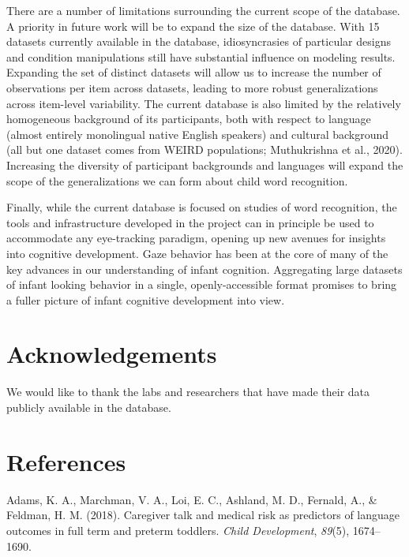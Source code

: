 \documentclass[10pt, letterpaper]{article}
\begin{document}
There are a number of limitations surrounding the current scope of the
database. A priority in future work will be to expand the size of the
database. With 15 datasets currently available in the database,
idiosyncrasies of particular designs and condition manipulations still
have substantial influence on modeling results. Expanding the set of
distinct datasets will allow us to increase the number of observations
per item across datasets, leading to more robust generalizations across
item-level variability. The current database is also limited by the
relatively homogeneous background of its participants, both with respect
to language (almost entirely monolingual native English speakers) and
cultural background (all but one dataset comes from WEIRD populations;
Muthukrishna et al., 2020). Increasing the diversity of participant
backgrounds and languages will expand the scope of the generalizations
we can form about child word recognition.

Finally, while the current database is focused on studies of word
recognition, the tools and infrastructure developed in the project can
in principle be used to accommodate any eye-tracking paradigm, opening
up new avenues for insights into cognitive development. Gaze behavior
has been at the core of many of the key advances in our understanding of
infant cognition. Aggregating large datasets of infant looking behavior
in a single, openly-accessible format promises to bring a fuller picture
of infant cognitive development into view.

\hypertarget{acknowledgements}{%
\section{Acknowledgements}\label{acknowledgements}}

We would like to thank the labs and researchers that have made their
data publicly available in the database.

\hypertarget{references}{%
\section{References}\label{references}}

\setlength{\parindent}{-0.1in} 
\setlength{\leftskip}{0.125in}

\noindent

\hypertarget{refs}{}
\leavevmode\hypertarget{ref-Adams2018}{}%
Adams, K. A., Marchman, V. A., Loi, E. C., Ashland, M. D., Fernald, A.,
\& Feldman, H. M. (2018). Caregiver talk and medical risk as predictors
of language outcomes in full term and preterm toddlers. \emph{Child
Development}, \emph{89}(5), 1674--1690.
\end{document}
